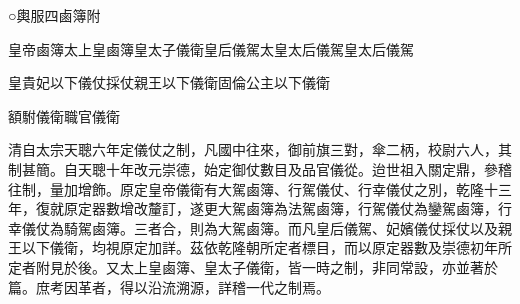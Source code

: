 
\begin{pinyinscope}
○輿服四鹵簿附

皇帝鹵簿太上皇鹵簿皇太子儀衛皇后儀駕太皇太后儀駕皇太后儀駕

皇貴妃以下儀仗採仗親王以下儀衛固倫公主以下儀衛

額駙儀衛職官儀衛

清自太宗天聰六年定儀仗之制，凡國中往來，御前旗三對，傘二柄，校尉六人，其制甚簡。自天聰十年改元崇德，始定御仗數目及品官儀從。迨世祖入關定鼎，參稽往制，量加增飾。原定皇帝儀衛有大駕鹵簿、行駕儀仗、行幸儀仗之別，乾隆十三年，復就原定器數增改釐訂，遂更大駕鹵簿為法駕鹵簿，行駕儀仗為鑾駕鹵簿，行幸儀仗為騎駕鹵簿。三者合，則為大駕鹵簿。而凡皇后儀駕、妃嬪儀仗採仗以及親王以下儀衛，均視原定加詳。茲依乾隆朝所定者標目，而以原定器數及崇德初年所定者附見於後。又太上皇鹵簿、皇太子儀衛，皆一時之制，非同常設，亦並著於篇。庶考因革者，得以沿流溯源，詳稽一代之制焉。


\end{pinyinscope}
